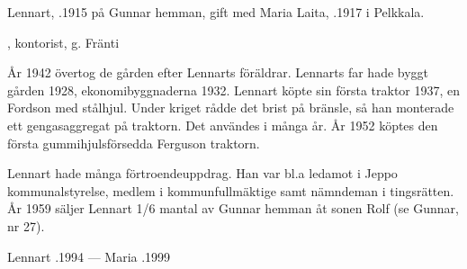 Lennart, .1915 på Gunnar hemman, gift med Maria Laita, .1917 i Pelkkala.
\begin{jhchildren}
  \item {}
  \item {}
  \item {}
  \item {}, kontorist, g. Fränti
  \item {}
  \item {}
\end{jhchildren}


År 1942 övertog de gården efter Lennarts föräldrar. Lennarts far hade byggt gården 1928, ekonomibyggnaderna 1932. Lennart köpte sin första traktor 1937, en Fordson med stålhjul. Under kriget rådde det brist på bränsle, så han monterade ett gengasaggregat på traktorn. Det användes i många år. År 1952 köptes den första gummihjulsförsedda Ferguson traktorn.

Lennart hade många förtroendeuppdrag. Han var bl.a ledamot i Jeppo kommunalstyrelse, medlem i kommunfullmäktige samt nämndeman i tingsrätten. År 1959 säljer Lennart 1/6 mantal av Gunnar hemman åt sonen Rolf (se Gunnar, nr 27).

Lennart .1994  ---  Maria .1999





